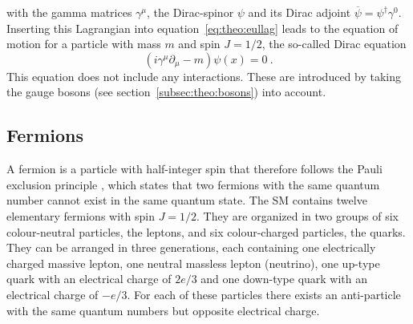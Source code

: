 with the gamma matrices $\gamma^\mu$, the Dirac-spinor $\psi$ and its Dirac adjoint $\overline{\psi}=\psi^\dagger \gamma^0$. Inserting this Lagrangian into equation~\ref{eq:theo:eullag} leads to the equation of motion for a particle with mass $m$ and spin $J=1/2$, the so-called Dirac equation
\begin{equation}
\left(i\gamma^\mu\partial_\mu-m\right)\psi(x)=0 ~.
\end{equation}
This equation does not include any interactions. These are introduced by taking the gauge bosons (see section~\ref{subsec:theo:bosons}) into account.\\

\subsection{Fermions}
A fermion is a particle with half-integer spin that therefore follows the Pauli exclusion principle \cite{pauli}, which states that two fermions with the same quantum number cannot exist in the same quantum state. The SM contains twelve elementary fermions with spin $J=1/2$. They are organized in two groups of six colour-neutral particles, the leptons, and six colour-charged particles, the quarks. They can be arranged in three generations, each containing one electrically charged massive lepton, one neutral massless lepton (neutrino), one up-type quark with an electrical charge of $2e/3$ and one down-type quark with an electrical charge of $-e/3$. For each of these particles there exists an anti-particle with the same quantum numbers but opposite electrical charge.\\
 
